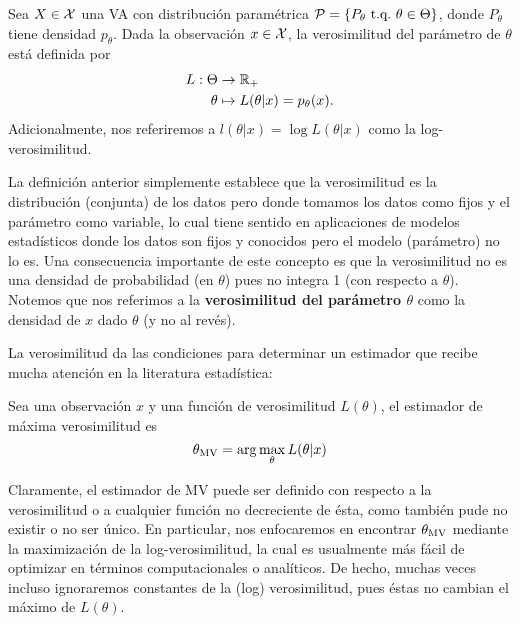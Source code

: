 \begin{definition}
	\label{def:verosimilitud}
	Sea $X\in{\mathcal X}$ una VA con distribución paramétrica $\mathcal{P} = \{P_\theta\ {\text{t.q.}}\ \theta\in\Theta\}$, donde $P_\theta$ tiene densidad $p_\theta$. Dada la observación $x \in{\mathcal X}$, la verosimilitud del parámetro de $\theta$ está definida por
	\begin{align*}
		L: \Theta &\rightarrow {\mathbb R}_+\\
			\theta &\mapsto L(\theta|x) = p_\theta(x).
	\end{align*}
	Adicionalmente, nos referiremos a $l(\theta|x)=\log L(\theta|x)$ como la log-verosimilitud.
\end{definition}
La definición anterior simplemente establece que la verosimilitud es la distribución (conjunta) de los datos pero donde tomamos los datos como fijos y el parámetro como variable, lo cual tiene sentido en aplicaciones de modelos estadísticos donde los datos son fijos y conocidos pero el modelo (parámetro)
no lo es. Una consecuencia importante de este concepto es que la verosimilitud no es una densidad de probabilidad (en $\theta$) pues no integra 1 (con respecto a $\theta$). Notemos que nos referimos a la \textbf{verosimilitud del parámetro $\theta$} como la densidad de $x$ dado $\theta$ (y no al revés).

La verosimilitud da las condiciones para determinar un estimador que recibe mucha atención en la literatura estadística: 

\begin{definition}
	Sea una observación $x$ y una función de verosimilitud $L(\theta)$, el estimador de máxima verosimilitud es 
	\begin{equation}
		{\theta_\text{MV}} = \arg\max_\theta L(\theta|x)
	\end{equation}	
\end{definition}

Claramente, el estimador de MV puede ser definido con respecto a la verosimilitud o a cualquier función no decreciente de ésta, como también pude no existir o no ser único. En particular, nos enfocaremos en encontrar ${\theta_\text{MV}}$ mediante la maximización de la log-verosimilitud, la cual es usualmente más fácil de optimizar en términos computacionales o analíticos. De hecho, muchas veces incluso ignoraremos constantes de la (log) verosimilitud, pues éstas no cambian el máximo de $L(\theta)$.

